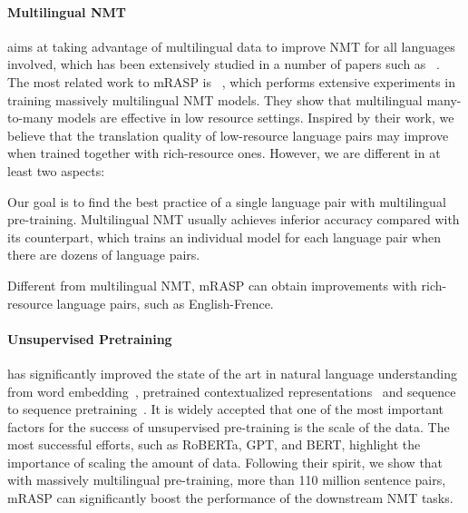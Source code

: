 \documentclass[11pt,a4paper]{article}
\newcommand{\method}{mRASP\xspace}
\begin{document}
\paragraph{ Multilingual NMT}  aims at taking advantage of multilingual data to improve NMT for all languages involved, which has been extensively studied in a number of papers such as ~\citet{dong2015multi,DBLP:journals/tacl/JohnsonSLKWCTVW17,lu2018neural,rahimi2019massively,tan2019multilingual}. 
The most related work to \method is ~\citet{rahimi2019massively}, which performs extensive experiments in
training massively multilingual NMT models.  
They show that multilingual many-to-many models are effective in low resource settings.
Inspired by their work, we believe that the translation quality of  low-resource language pairs may improve when trained together with rich-resource ones.
However, we are different in at least two aspects: \begin{inparaenum}[\it a)]
    \item Our goal is to find the best practice of a single language pair with multilingual pre-training. Multilingual NMT usually achieves inferior accuracy compared with its counterpart, which trains an individual model for each language pair when there are dozens of language pairs.
    \item Different from multilingual NMT, \method can obtain improvements with rich-resource language pairs, such as English-Frence.
\end{inparaenum}

\paragraph{Unsupervised Pretraining}  has
significantly improved the state of the art in natural language understanding from word embedding~\cite{mikolov2013distributed,pennington2014glove}, pretrained contextualized representations~\cite{DBLP:conf/naacl/PetersNIGCLZ18,radford2019language,DBLP:conf/naacl/DevlinCLT19} and sequence to sequence pretraining~\cite{DBLP:conf/icml/SongTQLL19}. 
It is widely accepted that one of the most important factors for the success of unsupervised pre-training is the scale of the data. 
The most successful efforts, such as RoBERTa, GPT, and BERT, highlight the importance of scaling the amount of data. 
Following their spirit,  we show that with massively multilingual pre-training, more than 110 million sentence pairs, \method can significantly boost the performance of the downstream NMT tasks. 
\end{document}
